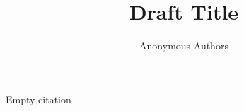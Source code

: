 \documentclass[review=false,nonacm]{acmart}
\title{Draft Title}
\author{Anonymous Authors}
\begin{document}
\begin{abstract}

\end{abstract}



\maketitle


Empty citation \cite{emptycitation}


\end{document}
